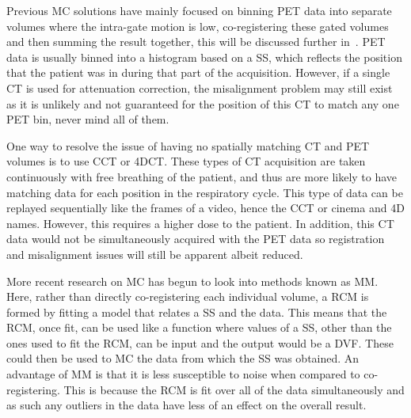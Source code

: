        Previous \gls{MC} solutions have mainly focused on binning \gls{PET} data into separate volumes where the intra-gate motion is low, co-registering these gated volumes and then summing the result together, this will be discussed further in~. \gls{PET} data is usually binned into a histogram based on a \gls{SS}, which reflects the position that the patient was in during that part of the acquisition. However, if a single \gls{CT} is used for attenuation correction, the misalignment problem may still exist as it is unlikely and not guaranteed for the position of this \gls{CT} to match any one \gls{PET} bin, never mind all of them.
        
        One way to resolve the issue of having no spatially matching \gls{CT} and \gls{PET} volumes is to use \gls{CCT} or \gls{4DCT}. These types of \gls{CT} acquisition are taken continuously with free breathing of the patient, and thus are more likely to have matching data for each position in the respiratory cycle.  This type of data can be replayed sequentially like the frames of a video, hence the \gls{CCT} or cinema and \gls{4D} names. However, this requires a higher dose to the patient. In addition, this \gls{CT} data would not be simultaneously acquired with the \gls{PET} data so registration and misalignment issues will still be apparent albeit reduced. 
        
        More recent research on \gls{MC} has begun to look into methods known as \gls{MM}. Here, rather than directly co-registering each individual volume, a \gls{RCM} is formed by fitting a model that relates a \gls{SS} and the data. This means that the \gls{RCM}, once fit, can be used like a function where values of a \gls{SS}, other than the ones used to fit the \gls{RCM}, can be input and the output would be a \gls{DVF}. These  could then be used to \gls{MC} the data from which the \gls{SS} was obtained. An advantage of \gls{MM} is that it is less susceptible to noise when compared to co-registering. This is because the \gls{RCM} is fit over all of the data simultaneously and as such any outliers in the data have less of an effect on the overall result.
    
